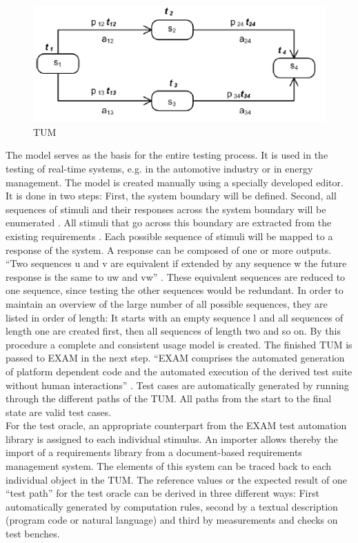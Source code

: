 \begin{figure}[H]
	\centering
	\includegraphics{../images/TUM}
	\caption{TUM \cite{Siegl2010}}
\end{figure}
The model serves as the basis for the entire testing process. It is
used in the testing of real-time systems, e.g. in the automotive industry
or in energy management. The model is created manually using a specially
developed editor. \\
It is done in two steps: First, the system boundary will be defined.
Second, all sequences of stimuli and their responses across the system
boundary will be enumerated \cite{Siegl2010}. All stimuli that go
across this boundary are extracted from the existing requirements
\cite{Siegl2010}. Each possible sequence of stimuli will be mapped
to a response of the system. A response can be composed of one or
more outputs. \enquote{Two sequences u and v are equivalent if
extended by any sequence w the future response is the same to uw and
vw} \cite{Siegl2010}. These equivalent sequences are
reduced to one sequence, since testing the other sequences would be
redundant. In order to maintain an overview of the large number of
all possible sequences, they are listed in order of length: It starts
with an empty sequence \textgreek{l} %
and all sequences of length one
are created first, then all sequences of length two and so on. By
this procedure a complete and consistent usage model is created. The
finished TUM is passed to EXAM in the next step. \enquote{EXAM
comprises the automated generation of platform dependent code and
the automated execution of the derived test suite without human interactions}
\cite{Siegl2010}. Test cases are automatically generated by running
through the different paths of the TUM. All paths from the start to
the final state are valid test cases.\\
For the test oracle, an appropriate counterpart from the EXAM test
automation library is assigned to each individual stimulus. An importer
allows thereby the import of a requirements library from a document-based
requirements management system. The elements of this system can be
traced back to each individual object in the TUM. The reference values
or the expected result of one \enquote{test path}
for the test oracle can be derived in three different ways: First
automatically generated by computation rules, second by a textual
description (program code or natural language) and third by measurements
and checks on test benches.

